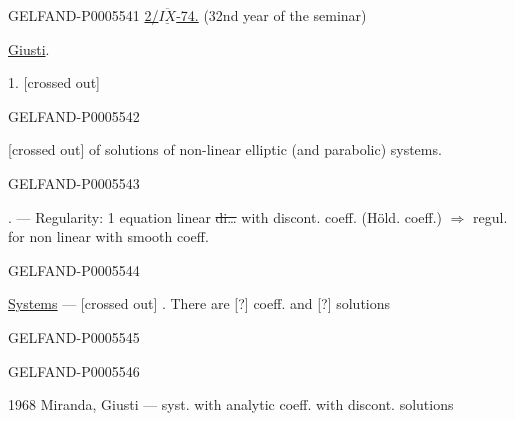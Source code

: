 \begin{GelfandAdjacentEvidence}{GELFAND-P000554}{1}
\uline{2/\mbox{$\overline{\underline{IX}}$}-74.}\qquad
{}\quad (32nd year of the seminar)

\uline{Giusti}.

1.  [crossed out] 
\end{GelfandAdjacentEvidence}
\begin{GelfandAdjacentEvidence}{GELFAND-P000554}{2}

[crossed out] of solutions of non-linear elliptic (and parabolic) systems.
\end{GelfandAdjacentEvidence}
\begin{GelfandAdjacentEvidence}{GELFAND-P000554}{3}

. — Regularity: 1 equation linear
\sout{di\ldots} with discont. coeff. (Höld. coeff.)
\(\Rightarrow\) regul. for non linear with smooth coeff.
\end{GelfandAdjacentEvidence}
\begin{GelfandAdjacentEvidence}{GELFAND-P000554}{4}

\uline{Systems} — [crossed out] . There are [?] coeff. and [?] solutions
\end{GelfandAdjacentEvidence}
\begin{GelfandAdjacentEvidence}{GELFAND-P000554}{5}

\end{GelfandAdjacentEvidence}
\begin{GelfandAdjacentEvidence}{GELFAND-P000554}{6}

1968 Miranda, Giusti — syst. with analytic coeff. with discont. solutions
\end{GelfandAdjacentEvidence}
